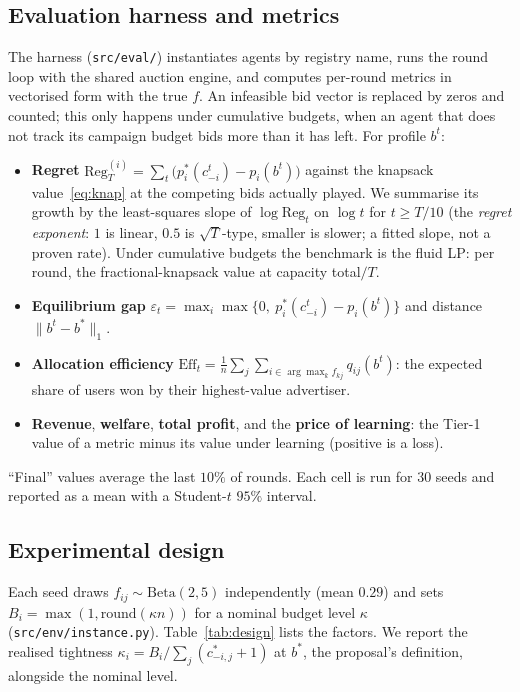 \documentclass{article}
\theoremstyle{definition}
\newcommand{\Reg}{\mathrm{Reg}}
\newcommand{\Eff}{\mathrm{Eff}}
\begin{document}
\subsection{Evaluation harness and metrics}\label{sec:harness}
The harness (\texttt{src/eval/}) instantiates agents by registry name, runs the round loop with the shared
auction engine, and computes per-round metrics in vectorised form with the true $f$. An infeasible bid
vector is replaced by zeros and counted; this only happens under cumulative budgets, when an agent that
does not track its campaign budget bids more than it has left. For profile $b^t$:
\begin{itemize}
  \item \textbf{Regret} $\Reg^{(i)}_T=\sum_t\big(p_i^\ast(c^t_{-i})-p_i(b^t)\big)$ against the
        knapsack value~\eqref{eq:knap} at the competing bids actually played. We summarise its growth by
        the least-squares slope of $\log\Reg_t$ on $\log t$ for $t\ge T/10$ (the \emph{regret exponent}:
        $1$ is linear, $0.5$ is $\sqrt T$-type, smaller is slower; a fitted slope, not a proven rate). Under cumulative budgets the
        benchmark is the fluid LP: per round, the fractional-knapsack value at capacity total$/T$.
  \item \textbf{Equilibrium gap} $\varepsilon_t=\max_i\max\{0,\ p_i^\ast(c^t_{-i})-p_i(b^t)\}$ and
        distance $\|b^t-b^\ast\|_1$.
  \item \textbf{Allocation efficiency} $\Eff_t=\frac1n\sum_j\sum_{i\in\arg\max_k f_{kj}}q_{ij}(b^t)$:
        the expected share of users won by their highest-value advertiser.
  \item \textbf{Revenue}, \textbf{welfare}, \textbf{total profit}, and the \textbf{price of learning}:
        the Tier-1 value of a metric minus its value under learning (positive is a loss).
\end{itemize}
``Final'' values average the last $10\%$ of rounds. Each cell is run for $30$ seeds and reported as a
mean with a Student-$t$ $95\%$ interval.

\subsection{Experimental design}\label{sec:design}
Each seed draws $f_{ij}\sim\mathrm{Beta}(2,5)$ independently (mean $0.29$) and sets
$B_i=\max(1,\mathrm{round}(\kappa n))$ for a nominal budget level $\kappa$
(\texttt{src/env/instance.py}). Table~\ref{tab:design} lists the factors. We report the realised tightness
$\kappa_i=B_i/\sum_j(c^\ast_{-i,j}+1)$ at $b^\ast$, the proposal's definition, alongside the nominal level.
\end{document}
